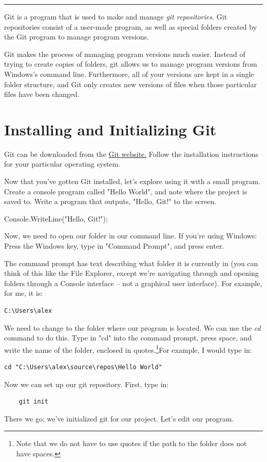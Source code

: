 \documentclass[oneside, openany] {book}
\begin{document}
\noindent\rule{12.5cm}{0.4pt}
Git is a program that is used to make and manage \emph{git repositories}. Git repositories consist of a user-made program, as well as special folders created by the Git program to manage program versions.

Git makes the process of managing program versions much easier. Instead of trying to create copies of folders, git allows us to manage program versions from Windows's command line. Furthermore, all of your versions are kept in a single folder structure, and Git only creates new versions of files when those particular files have been changed.
\section{Installing and Initializing Git}
Git can be downloaded from the \href{https://git-scm.com/}{Git website.} Follow the installation instructions for your particular operating system.

Now that you've gotten Git installed, let's explore using it with a small program. Create a console program called "Hello World", and note where the project is saved to. 
Write a program that outputs, "Hello, Git!" to the screen.

\begin{CSharp}
Console.WriteLine("Hello, Git!");
\end{CSharp}
Now, we need to open our folder in our command line. If you're using Windows:
Press the Windows key, type in "Command Prompt", and press enter.

The command prompt has text describing what folder it is currently in (you can think of this like the File Explorer, except we're navigating through and opening folders through a Console interface -- not a graphical user interface). For example, for me, it is:
\begin{verbatim}
C:\Users\alex
\end{verbatim}
We need to change to the folder where our program is located. We can use the \emph{cd} command to do this. Type in "cd" into the command prompt, press space, and write the name of the folder, enclosed in quotes.\footnote{Note that we do not have to use quotes if the path to the folder does not have spaces.}For example, I would type in:
\begin{verbatim}
cd "C:\Users\alex\source\repos\Hello World"
\end{verbatim}
Now we can set up our git repository.
First, type in:
\begin{verbatim}
    git init
\end{verbatim}
There we go; we've initialized git for our project. Let's edit our program.
\end{document}
